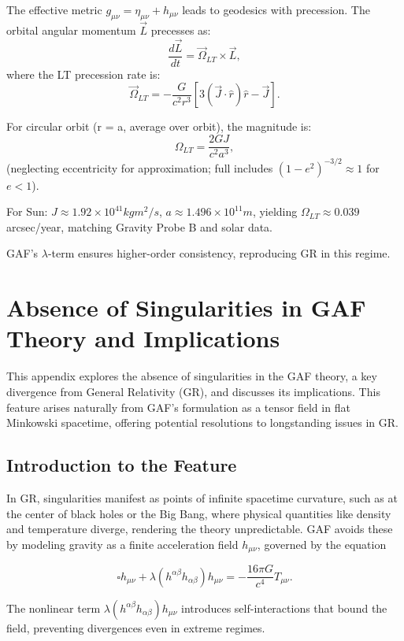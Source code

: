 \documentclass{article}
\begin{document}
The effective metric \( g_{\mu\nu} = \eta_{\mu\nu} + h_{\mu\nu} \) leads to geodesics with precession. The orbital angular momentum \(\vec{L}\) precesses as:
\[
\frac{d\vec{L}}{dt} = \vec{\Omega}_{LT} \times \vec{L},
\]
where the LT precession rate is:
\[
\vec{\Omega}_{LT} = -\frac{G}{c^2 r^3} \left[ 3 (\vec{J} \cdot \hat{r}) \hat{r} - \vec{J} \right].
\]

For circular orbit (r = a, average over orbit), the magnitude is:
\[
\Omega_{LT} = \frac{2 G J}{c^2 a^3},
\]
(neglecting eccentricity for approximation; full includes \((1-e^2)^{-3/2} \approx 1\) for \(e<1\)).

For Sun: \(J \approx 1.92 \times 10^{41} kg m^2/s\), \(a \approx 1.496 \times 10^{11} m\), yielding \(\Omega_{LT} \approx 0.039\) arcsec/year, matching Gravity Probe B and solar data.

GAF's \( \lambda \)-term ensures higher-order consistency, reproducing GR in this regime.

\section{Absence of Singularities in GAF Theory and Implications}

This appendix explores the absence of singularities in the GAF theory, a key divergence from General Relativity (GR), and discusses its implications. This feature arises naturally from GAF's formulation as a tensor field in flat Minkowski spacetime, offering potential resolutions to longstanding issues in GR.

\subsection{Introduction to the Feature}

In GR, singularities manifest as points of infinite spacetime curvature, such as at the center of black holes or the Big Bang, where physical quantities like density and temperature diverge, rendering the theory unpredictable. GAF avoids these by modeling gravity as a finite acceleration field \( h_{\mu\nu} \), governed by the equation

\[
\square h_{\mu\nu} + \lambda (h^{\alpha\beta} h_{\alpha\beta}) h_{\mu\nu} = -\frac{16\pi G}{c^4} T_{\mu\nu}.
\]

The nonlinear term \( \lambda (h^{\alpha\beta} h_{\alpha\beta}) h_{\mu\nu} \) introduces self-interactions that bound the field, preventing divergences even in extreme regimes.
\end{document}
